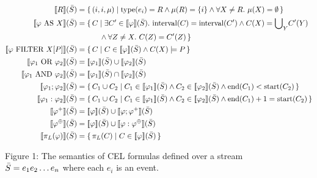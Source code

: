 \begin{figure}[t]
\[
\begin{aligned}
	\text{\textlbrackdbl} R \text{\textrbrackdbl}(\Stream) 
	&= \{\, (i, i, \mu)
	\mid \text{type}(e_i) = R 
	\land \mu(R) = \{i\} 
	\land \forall X \neq R.\ \mu(X) = \emptyset \,\} \\
	\text{\textlbrackdbl} \varphi\ \text{AS}\ X \text{\textrbrackdbl}(\Stream) 
	&= \{\, C 
	\mid \exists C' \in \text{\textlbrackdbl} \varphi \text{\textrbrackdbl}(\Stream).\
	\text{interval}(C) = \text{interval}(C') 
	\land C(X) = {\bigcup}_Y C'(Y) \\& \hspace{30pt}	
	\land \forall Z \neq X.\ C(Z) = C'(Z) \,\} \\
	\text{\textlbrackdbl} \varphi\ \text{FILTER}\ X[P] \text{\textrbrackdbl}(\Stream) 
	&= \{\, C 
	\mid C \in \text{\textlbrackdbl} \varphi \text{\textrbrackdbl}(\Stream) 
	\land C(X) \models P \,\} \\
	\text{\textlbrackdbl} \varphi_1\ \text{OR}\ \varphi_2 \text{\textrbrackdbl}(\Stream) 
	&= \text{\textlbrackdbl} \varphi_1 \text{\textrbrackdbl}(\Stream) 
	\cup 
	\text{\textlbrackdbl} \varphi_2 \text{\textrbrackdbl}(\Stream) \\
	\text{\textlbrackdbl} \varphi_1\ \text{AND}\ \varphi_2 \text{\textrbrackdbl}(\Stream) 
	&= \text{\textlbrackdbl} \varphi_1 \text{\textrbrackdbl}(\Stream) 
	\cap 
	\text{\textlbrackdbl} \varphi_2 \text{\textrbrackdbl}(\Stream) \\
	\text{\textlbrackdbl} \varphi_1 ; \varphi_2 \text{\textrbrackdbl}(\Stream) 
	&= \{\, C_1 \cup C_2 
	\mid C_1 \in \text{\textlbrackdbl} \varphi_1 \text{\textrbrackdbl}(\Stream) 
	\land C_2 \in \text{\textlbrackdbl} \varphi_2 \text{\textrbrackdbl}(\Stream)
	\land \text{end}(C_1) < \text{start}(C_2) \,\} \\
	\text{\textlbrackdbl} \varphi_1 : \varphi_2 \text{\textrbrackdbl}(\Stream) 
	&= \{\, C_1 \cup C_2 
	\mid C_1 \in \text{\textlbrackdbl} \varphi_1 \text{\textrbrackdbl}(\Stream) 
	\land C_2 \in \text{\textlbrackdbl} \varphi_2 \text{\textrbrackdbl}(\Stream)
	\land \text{end}(C_1) + 1 = \text{start}(C_2) \,\} \\
	\text{\textlbrackdbl} \varphi^{+} \text{\textrbrackdbl}(\Stream) 
	&= \text{\textlbrackdbl} \varphi \text{\textrbrackdbl}(\Stream) 
	\cup 
	\text{\textlbrackdbl} \varphi ; \varphi^{+} \text{\textrbrackdbl}(\Stream) \\
	\text{\textlbrackdbl} \varphi^{\oplus} \text{\textrbrackdbl}(\Stream) 
	&= \text{\textlbrackdbl} \varphi \text{\textrbrackdbl}(\Stream) 
	\cup 
	\text{\textlbrackdbl} \varphi : \varphi^{\oplus} \text{\textrbrackdbl}(\Stream) \\
	\text{\textlbrackdbl} \pi_{L}(\varphi) \text{\textrbrackdbl}(\Stream) 
	&= \{\, \pi_L(C) 
	\mid C \in \text{\textlbrackdbl} \varphi \text{\textrbrackdbl}(\Stream) \,\}
\end{aligned}
\]

\caption{Figure 1: The semantics of CEL formulas defined over a stream $\bar{S} = e_1 e_2\dots e_n$ where each $e_i$ is an event.}
\end{figure}
